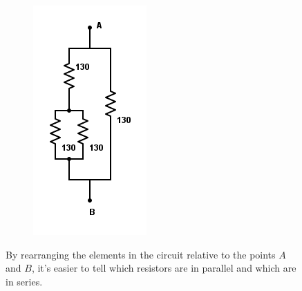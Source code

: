 \documentclass[11pt]{article}
\begin{document}
\begin{figure}[H]
\begin{subfigure}{0.3\textwidth}
            \includegraphics[width=\textwidth]{1_simplify3.png}
            \caption{}
            \label{fig:1_simplify3}
        \end{subfigure}
        \caption{By rearranging the elements in the circuit relative to the points $A$ and $B$, it's easier to tell which resistors are in parallel and which are in series.}
    \end{figure}
\end{document}
